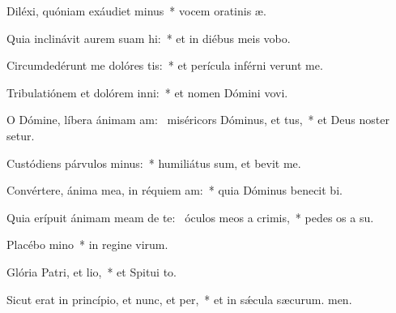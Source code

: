 \item Diléxi, quóniam exáudiet minus~* vocem oratinis æ.
\item Quia inclinávit aurem suam hi:~* et in diébus meis vobo.
\item Circumdedérunt me dolóres tis:~* et perícula inférni verunt me.
\item Tribulatiónem et dolórem inni:~* et nomen Dómini vovi.
\item O Dómine, líbera ánimam am:~\pscross{} miséricors Dóminus, et tus,~* et Deus noster setur.
\item Custódiens párvulos minus:~* humiliátus sum, et bevit me.
\item Convértere, ánima mea, in réquiem am:~* quia Dóminus benecit bi.
\item Quia erípuit ánimam meam de te:~\pscross{} óculos meos a crimis,~* pedes os a su.
\item Placébo mino~* in regine virum.
\item Glória Patri, et lio,~* et Spitui to.
\item Sicut erat in princípio, et nunc, et per,~* et in sǽcula sæcurum. men.
